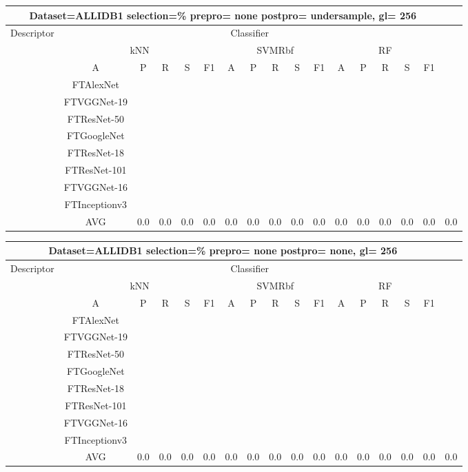 \documentclass[12pt,italian]{article}
\begin{document}
\begin{tiny}
\begin{longtable}{lcccccccccccccccc}
\toprule
\multicolumn{16}{c}{Dataset=ALLIDB1 selection=\% prepro= none postpro= undersample, gl= 256} \\ 
\toprule
Descriptor & \multicolumn{15}{c}{Classifier} \\ 
& \multicolumn{5}{c}{kNN} & \multicolumn{5}{c}{SVMRbf} & \multicolumn{5}{c}{RF} \\ 
& A & P & R & S & F1 & A & P & R & S & F1 & A & P & R & S & F1 \\ 
\midrule
& FTAlexNet \\ 
& FTVGGNet-19 \\ 
& FTResNet-50 \\ 
& FTGoogleNet \\ 
& FTResNet-18 \\ 
& FTResNet-101 \\ 
& FTVGGNet-16 \\ 
& FTInceptionv3 \\ 
\hline
& AVG &  0.0 &  0.0 &  0.0 &  0.0 &  0.0 &  0.0 &  0.0 &  0.0 &  0.0 &  0.0 &  0.0 &  0.0 &  0.0 &  0.0 &  0.0 \\ 
\hline
\bottomrule
\end{longtable} 

 \pagebreak 
\begin{longtable}{lcccccccccccccccc}
\toprule
\multicolumn{16}{c}{Dataset=ALLIDB1 selection=\% prepro= none postpro= none, gl= 256} \\ 
\toprule
Descriptor & \multicolumn{15}{c}{Classifier} \\ 
& \multicolumn{5}{c}{kNN} & \multicolumn{5}{c}{SVMRbf} & \multicolumn{5}{c}{RF} \\ 
& A & P & R & S & F1 & A & P & R & S & F1 & A & P & R & S & F1 \\ 
\midrule
& FTAlexNet \\ 
& FTVGGNet-19 \\ 
& FTResNet-50 \\ 
& FTGoogleNet \\ 
& FTResNet-18 \\ 
& FTResNet-101 \\ 
& FTVGGNet-16 \\ 
& FTInceptionv3 \\ 
\hline
& AVG &  0.0 &  0.0 &  0.0 &  0.0 &  0.0 &  0.0 &  0.0 &  0.0 &  0.0 &  0.0 &  0.0 &  0.0 &  0.0 &  0.0 &  0.0 \\ 
\hline
\bottomrule
\end{longtable} 

 \pagebreak 
\end{tiny} 
 
\end{document}

